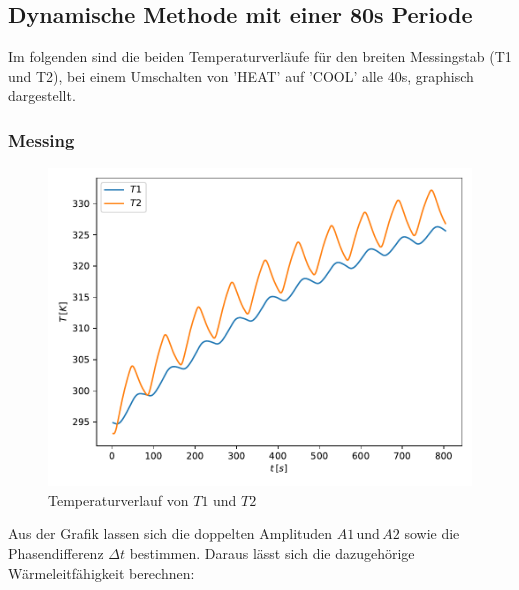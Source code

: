     \subsection{Dynamische Methode mit einer 80s Periode}

    Im folgenden sind die beiden Temperaturverläufe für den breiten Messingstab (T1 und T2), bei einem Umschalten von 'HEAT' auf 'COOL' alle 40s, graphisch dargestellt.

    \subsubsection{Messing}

    \begin{figure}
    \centering
    \includegraphics[width=\textwidth]{Daten/grafic3.pdf}
    \caption{Temperaturverlauf von $T1$ und $T2$}
    \label{fig:dyn_T1}
    \end{figure}
    \noindent
    Aus der Grafik lassen sich die doppelten Amplituden $A1 \, \text{und} \, A2$ sowie die Phasendifferenz $\Delta t$ bestimmen. Daraus lässt sich die dazugehörige Wärmeleitfähigkeit berechnen:
    \newpage
